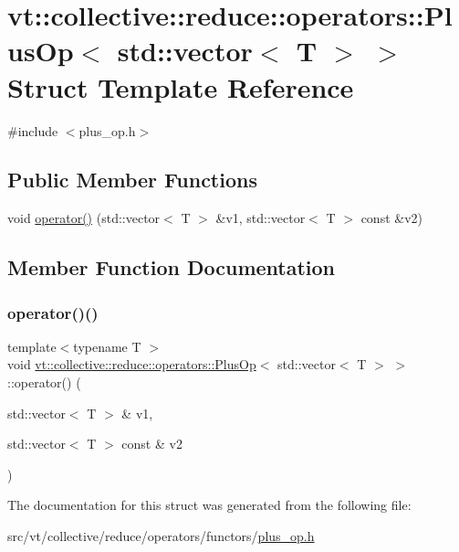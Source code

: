 \hypertarget{structvt_1_1collective_1_1reduce_1_1operators_1_1_plus_op_3_01std_1_1vector_3_01_t_01_4_01_4}{}\section{vt\+:\+:collective\+:\+:reduce\+:\+:operators\+:\+:Plus\+Op$<$ std\+:\+:vector$<$ T $>$ $>$ Struct Template Reference}
\label{structvt_1_1collective_1_1reduce_1_1operators_1_1_plus_op_3_01std_1_1vector_3_01_t_01_4_01_4}


{\ttfamily \#include $<$plus\+\_\+op.\+h$>$}

\subsection*{Public Member Functions}
\begin{DoxyCompactItemize}
\item 
void \hyperlink{structvt_1_1collective_1_1reduce_1_1operators_1_1_plus_op_3_01std_1_1vector_3_01_t_01_4_01_4_a9d89d4a39af6b33233fe59ab5b78c6dd}{operator()} (std\+::vector$<$ T $>$ \&v1, std\+::vector$<$ T $>$ const \&v2)
\end{DoxyCompactItemize}


\subsection{Member Function Documentation}
\mbox{\label{structvt_1_1collective_1_1reduce_1_1operators_1_1_plus_op_3_01std_1_1vector_3_01_t_01_4_01_4_a9d89d4a39af6b33233fe59ab5b78c6dd}} 
\subsubsection{\texorpdfstring{operator()()}{operator()()}}
{\footnotesize\ttfamily template$<$typename T $>$ \\
void \hyperlink{structvt_1_1collective_1_1reduce_1_1operators_1_1_plus_op}{vt\+::collective\+::reduce\+::operators\+::\+Plus\+Op}$<$ std\+::vector$<$ T $>$ $>$\+::operator() (\begin{DoxyParamCaption}\item[{std\+::vector$<$ T $>$ \&}]{v1,  }\item[{std\+::vector$<$ T $>$ const \&}]{v2 }\end{DoxyParamCaption})\hspace{0.3cm}{\ttfamily [inline]}}



The documentation for this struct was generated from the following file\+:\begin{DoxyCompactItemize}
\item 
src/vt/collective/reduce/operators/functors/\hyperlink{plus__op_8h}{plus\+\_\+op.\+h}\end{DoxyCompactItemize}
